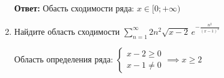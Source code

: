 \documentclass[10pt]{article} %
\begin{document}
\begin{large}
\begin{enumerate}
\textbf{Ответ:} Обасть сходимости ряда: $ x \in [0; +\infty) $

\item Найдите область сходимости $ \sum\limits_{n=1}^{\infty} 2n^2 \sqrt{x-2} \, e^{-\frac{n^2}{(x-1)^3}} $

Область определения ряда: $
\begin{cases}
    x - 2 \geq 0 \\
    x - 1 \neq 0
\end{cases}
\implies x \geq 2  $









\end{enumerate}

\begin{verbatim}


\end{verbatim}

\end{large}  
\end{document}
